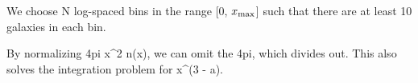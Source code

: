 We choose N log-spaced bins in the range [0, $x_{\rm max}$] such that there are at least 10 galaxies in each bin.

By normalizing 4pi x^2 n(x), we can omit the 4pi, which divides out. This also solves the integration problem for x^(3 - a).